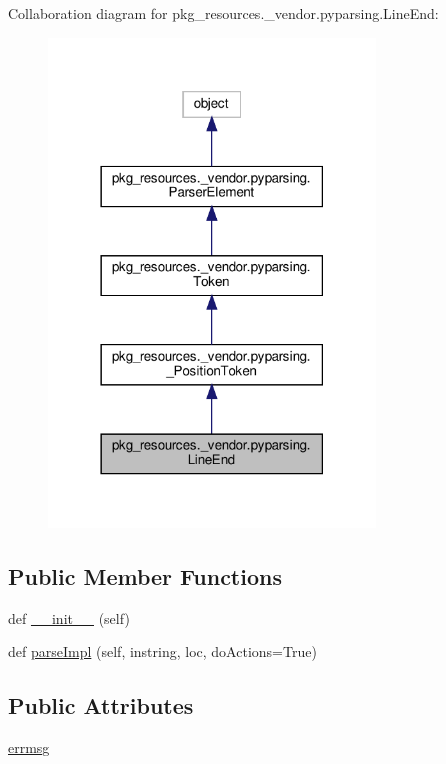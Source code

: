 Collaboration diagram for pkg\+\_\+resources.\+\_\+vendor.\+pyparsing.\+Line\+End\+:
\nopagebreak
\begin{figure}[H]
\begin{center}
\leavevmode
\includegraphics[width=246pt]{classpkg__resources_1_1__vendor_1_1pyparsing_1_1LineEnd__coll__graph}
\end{center}
\end{figure}
\subsection*{Public Member Functions}
\begin{DoxyCompactItemize}
\item 
def \hyperlink{classpkg__resources_1_1__vendor_1_1pyparsing_1_1LineEnd_adf8a08efef5c256c4c61aafe4860c659}{\+\_\+\+\_\+init\+\_\+\+\_\+} (self)
\item 
def \hyperlink{classpkg__resources_1_1__vendor_1_1pyparsing_1_1LineEnd_a9bfc547e9595456efcc8266fe71d80f9}{parse\+Impl} (self, instring, loc, do\+Actions=True)
\end{DoxyCompactItemize}
\subsection*{Public Attributes}
\begin{DoxyCompactItemize}
\item 
\hyperlink{classpkg__resources_1_1__vendor_1_1pyparsing_1_1LineEnd_a3029a49045592265c38d7f85bb19c5a3}{errmsg}
\end{DoxyCompactItemize}
